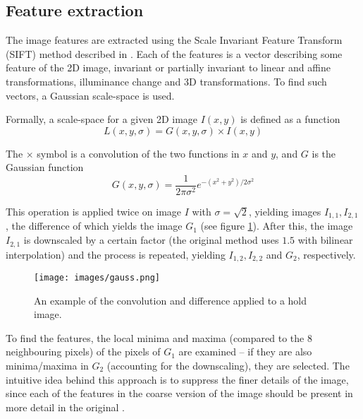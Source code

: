\subsection{Feature extraction} \label{ch:fext}
The image features are extracted using the Scale Invariant Feature Transform (SIFT) method described in \citet{lowe1999object,lowe2004distinctive,snavely2008modeling}.
Each of the features is a vector describing some feature of the 2D image, invariant or partially invariant to linear and affine transformations, illuminance change and 3D transformations.
To find such vectors, a Gaussian scale-space is used.

Formally, a scale-space for a given 2D image $I(x, y)$ is defined as a function
\begin{equation} L(x, y, \sigma) = G(x, y, \sigma) \times I(x, y) \end{equation}

The $\times$ symbol is a convolution of the two functions in $x$ and $y$, and $G$ is the Gaussian function
\begin{equation}G(x, y, \sigma) = \frac{1}{2\pi \sigma^2} e^{-(x^2 + y^2) / 2\sigma^2}\end{equation}

This operation is applied twice on image $I$ with $\sigma = \sqrt{2}$, yielding images $I_{1,1}, I_{2,1}$, the difference of which yields the image $G_1$ (see figure \ref{fig:gaussexample}).
After this, the image $I_{2,1}$ is downscaled by a certain factor (the original method uses $1.5$ with bilinear interpolation) and the process is repeated, yielding $I_{1,2}, I_{2,2}$ and $G_2$, respectively.


\begin{figure}
	\centering
	\texttt{[image: images/gauss.png]}
	\caption{An example of the convolution and difference applied to a hold image.}
	\label{fig:gaussexample}
\end{figure}

To find the features, the local minima and maxima (compared to the 8 neighbouring pixels) of the pixels of $G_1$ are examined -- if they are also minima/maxima in $G_2$ (accounting for the downscaling), they are selected.
The intuitive idea behind this approach is to suppress the finer details of the image, since each of the features in the coarse version of the image should be present in more detail in the original \cite{scalespace}.

